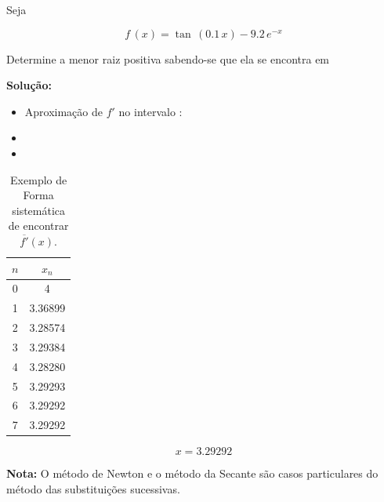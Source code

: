 \begin{example}
Seja 

\[
 f\,(x) = \tan\,(0.1\,x) - 9.2 \, e^{-x}
\]


Determine a menor raiz positiva sabendo-se que ela se encontra em \esp{[3,\,4]}

\textbf{Solução:}

\begin{itemize}
 \item Aproximação de $f'$ no intervalo \esp{[3,\,4]}:

 \item {}

 \item {}

\end{itemize}

\begin{table}[htp]
\footnotesize
	\centering
		
		\begin{tabular}{|c|c|}
		\hline		
		\textbf{$n$} & \textbf{$x_{n}$}\\
		\hline \hline 
		0 & 4\\
		\hline 
		1 & 3.36899\\
		\hline 
		2 & 3.28574\\
		\hline 
		3 & 3.29384\\
		\hline
		4 & 3.28280\\
		\hline
		5 & 3.29293\\
		\hline
		6 & 3.29292\\
		\hline
		7 & 3.29292\\
		\hline
		\end{tabular}
	\caption{Exemplo de Forma sistemática de encontrar $\overline{f'}(x)$.}
	\label{tab:sucessivo2}
\end{table}

\[
 x = 3.29292
\]

\end{example}

\textbf{Nota:} O método de Newton e o método da Secante são casos particulares do método das substituições sucessivas.
